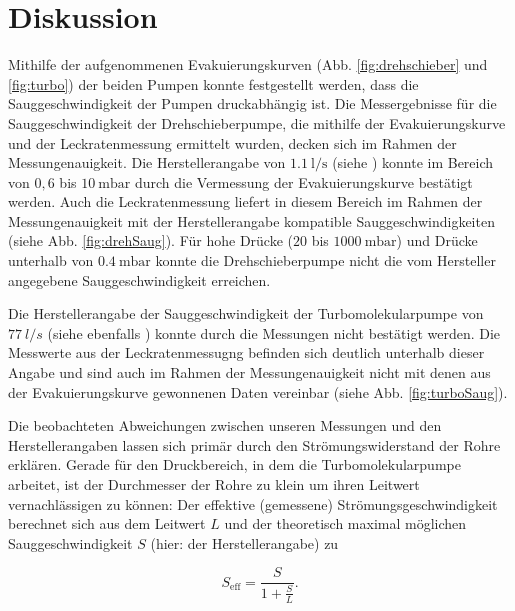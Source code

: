 \section{Diskussion}
\label{sec:Diskussion}

Mithilfe der aufgenommenen Evakuierungskurven (Abb. \ref{fig:drehschieber} und \ref{fig:turbo}) der beiden Pumpen konnte festgestellt werden, dass die Sauggeschwindigkeit der Pumpen druckabhängig ist. Die Messergebnisse für die Sauggeschwindigkeit der Drehschieberpumpe, die mithilfe der Evakuierungskurve und der Leckratenmessung ermittelt wurden, decken sich im Rahmen der Messungenauigkeit. Die Herstellerangabe von $\SI{1.1}{\litre \per \second}$ (siehe \cite{V70}) konnte im Bereich von $0,6$ bis $\SI{10}{\milli \bar}$ durch die Vermessung der Evakuierungskurve bestätigt werden. Auch die Leckratenmessung liefert in diesem Bereich im Rahmen der Messungenauigkeit mit der Herstellerangabe kompatible Sauggeschwindigkeiten (siehe Abb. \ref{fig:drehSaug}). Für hohe Drücke ($20$ bis  $\SI{1000}{\milli \bar}$) und Drücke unterhalb von  $\SI{0.4}{\milli \bar}$ konnte die Drehschieberpumpe nicht die vom Hersteller angegebene Sauggeschwindigkeit erreichen.

Die Herstellerangabe der Sauggeschwindigkeit der Turbomolekularpumpe von $\SI{77}{l/s}$ (siehe ebenfalls \cite{V70}) konnte durch die Messungen nicht bestätigt werden. Die Messwerte aus der Leckratenmessugng  befinden sich deutlich unterhalb dieser Angabe und sind auch im Rahmen der Messungenauigkeit nicht mit denen aus der Evakuierungskurve gewonnenen Daten vereinbar (siehe Abb. \ref{fig:turboSaug}). 

Die beobachteten Abweichungen zwischen unseren Messungen und den Herstellerangaben lassen sich primär durch den Strömungswiderstand der Rohre erklären. Gerade für den Druckbereich, in dem die Turbomolekularpumpe arbeitet, ist der Durchmesser der Rohre zu klein um ihren Leitwert vernachlässigen zu können: Der effektive (gemessene) Strömungsgeschwindigkeit berechnet sich aus dem Leitwert $L$ und der theoretisch maximal möglichen Sauggeschwindigkeit $S$ (hier: der Herstellerangabe) zu

\begin{equation}
	S_\text{eff} = \frac{S}{1 + \frac{S}{L}}.
\end{equation}


